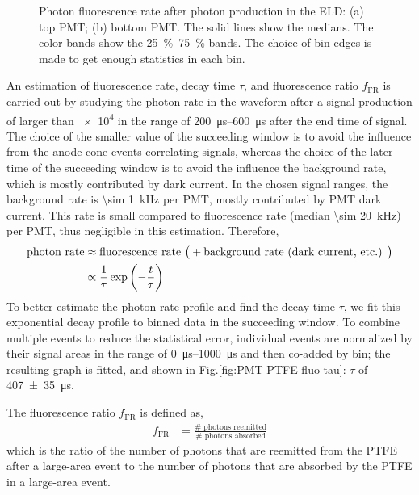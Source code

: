 \begin{figure}[!p]
\begin{subfigure}[t]{\twofigurewidth}
		\caption{}
		\label{fig:PMT PFTE fluo bottom}
	\end{subfigure}
	\caption[Photon fluorescence rate after photon production in the ELD.]{Photon fluorescence rate after photon production in the ELD: (a) top PMT; (b) bottom PMT. The solid lines show the medians. The color bands show the \SIrange{25}{75}{\percent} bands. The choice of bin edges is made to get enough statistics in each bin. }
	\label{fig:PMT PFTE fluo}
\end{figure}

An estimation of fluorescence rate, decay time $\tau$, and fluorescence ratio $f_{\text{FR}}$ is carried out by studying the photon rate in the waveform after a signal production of larger than \SI{e4}{\phe} in the range of \SIrange{200}{600}{\us} after the end time of signal. The choice of the smaller value of the succeeding window is to avoid the influence from the anode cone events correlating signals, whereas the choice of the later time of the succeeding window is to avoid the influence the background rate, which is mostly contributed by dark current. In the chosen signal ranges, the background rate is \SI{\sim 1}{\kHz} per PMT, mostly contributed by PMT dark current. This rate is small compared to fluorescence rate (median \SI{\sim 20}{\kHz}) per PMT, thus negligible in this estimation. Therefore,
\begin{align}
	\text{photon rate} & \approx \text{fluorescence rate}\ \big( + \text{background rate (dark current, etc.) \big)} \\
	&\propto \frac{1}{\tau} \exp \left( -\frac{t}{\tau} \right) \label{eqn:fluo}
\end{align} 
To better estimate the photon rate profile and find the decay time $\tau$, we fit this exponential decay profile to binned data in the succeeding window. To combine multiple events to reduce the statistical error, individual events are normalized by their signal areas in the range of \SIrange{0}{1000}{\us} and then co-added by bin; the resulting graph is fitted, and shown in 
Fig.\ref{fig:PMT PTFE fluo tau}: $\tau$ of \SI{407 \pm 35}{\us}.

The fluorescence ratio $f_{\text{FR}}$ is defined as,
\begin{align}
f_{\text{FR}} &= \frac{\text{\#\ photons reemitted}}{\text{\#\ photons absorbed}}
\end{align}
which is the ratio of the number of photons that are reemitted from the PTFE after a large-area event to the number of photons that are absorbed by the PTFE in a large-area event. 

